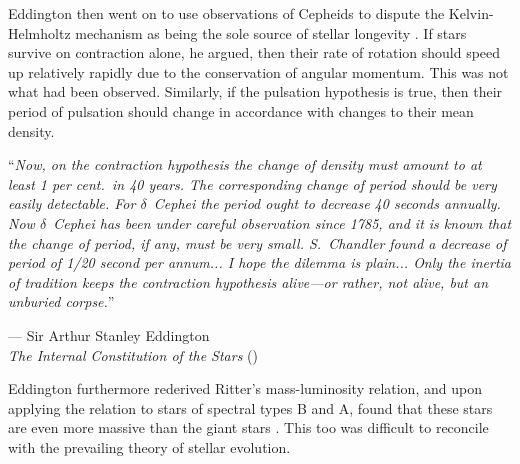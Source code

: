 Eddington then went on to use observations of Cepheids to dispute the Kelvin-Helmholtz mechanism as being the sole source of stellar longevity \citep{1920SciMo..11..297E}. 
If stars survive on contraction alone, he argued, then their rate of rotation should speed up relatively rapidly due to the conservation of angular momentum. 
This was not what had been observed. 
Similarly, if the pulsation hypothesis is true, then their period of pulsation should change in accordance with changes to their mean density. 
\epigraph{``\emph{Now, on the contraction hypothesis the change of density must amount to at least \hphantom{``}1 per cent.\ in 40 years. The corresponding change of period should be very easily \hphantom{``}detectable. For $\delta$~Cephei the period ought to decrease 40 seconds annually. Now \hphantom{``}$\delta$~Cephei has been under careful observation since 1785, and it is known that \hphantom{``}the change of period, if any, must be very small. S.~Chandler found a decrease of \hphantom{``}period of 1/20 second per annum... I hope the dilemma is plain... Only the inertia \hphantom{``}of tradition keeps the contraction hypothesis alive---or rather, not alive, but an \hphantom{``}unburied corpse.}''}{--- Sir Arthur Stanley Eddington \\\emph{The Internal Constitution of the Stars} (\citeyear{1920SciMo..11..297E})} 

Eddington furthermore rederived Ritter's mass-luminosity relation, and upon applying the relation to stars of spectral types B and A, found that these stars are even more massive than the giant stars \citep[e.g.,][]{1924MNRAS..84..308E}. 
This too was difficult to reconcile with the prevailing theory of stellar evolution. 

